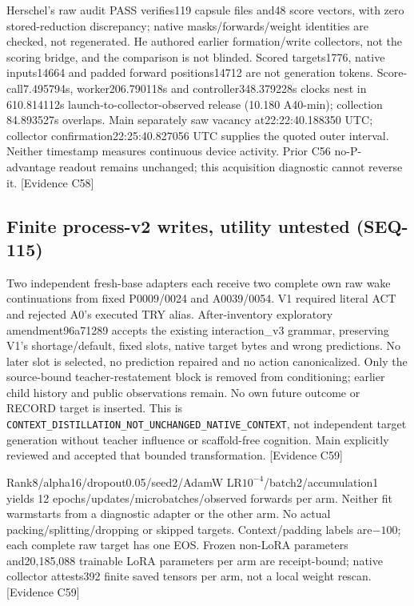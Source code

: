 \documentclass[11pt]{article}
\newcommand{\ev}[1]{\textsf{[Evidence #1]}}
\begin{document}
Herschel's raw audit PASS verifies119 capsule files and48 score vectors, with
zero stored-reduction discrepancy; native masks/forwards/weight identities are
checked, not regenerated. He authored earlier formation/write collectors, not
the scoring bridge, and the comparison is not blinded. Scored targets1776,
native inputs14664 and padded forward positions14712 are not generation tokens.
Score-call7.495794s, worker206.790118s and controller348.379228s clocks nest in
610.814112s launch-to-collector-observed release (10.180 A40-min); collection
84.893527s overlaps. Main separately saw vacancy at22:22:40.188350 UTC;
collector confirmation22:25:40.827056 UTC supplies the quoted outer interval.
Neither timestamp measures continuous device activity. Prior C56 no-P-advantage
readout remains unchanged; this acquisition diagnostic cannot reverse it. \ev{C58}

\subsection{Finite process-v2 writes, utility untested (SEQ-115)}
Two independent fresh-base adapters each receive two complete own raw wake
continuations from fixed P0009/0024 and A0039/0054. V1 required literal ACT and
rejected A0's executed TRY alias. After-inventory exploratory amendment96a71289
accepts the existing interaction\_v3 grammar, preserving V1's shortage/default,
fixed slots, native target bytes and wrong predictions. No later slot is selected,
no prediction repaired and no action canonicalized. Only the source-bound
teacher-restatement block is removed from conditioning; earlier child history
and public observations remain. No own future outcome or RECORD target is
inserted. This is \texttt{CONTEXT\_DISTILLATION\_NOT\_UNCHANGED\_NATIVE\_CONTEXT},
not independent target generation without teacher influence or scaffold-free
cognition. Main explicitly reviewed and accepted that bounded transformation.
\ev{C59}

Rank8/alpha16/dropout0.05/seed2/AdamW LR$10^{-4}$/batch2/accumulation1 yields
12 epochs/updates/microbatches/observed forwards per arm. Neither fit warmstarts
from a diagnostic adapter or the other arm. No actual packing/splitting/dropping
or skipped targets. Context/padding labels are$-100$; each complete raw target
has one EOS. Frozen non-LoRA parameters and20,185,088 trainable LoRA parameters
per arm are receipt-bound; native collector attests392 finite saved tensors per
arm, not a local weight rescan. \ev{C59}
\end{document}
